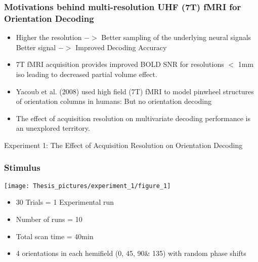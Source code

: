 \documentclass{beamer}
\begin{document}
	\begin{frame}
		\frametitle{Motivations behind multi-resolution UHF (7T) fMRI for Orientation Decoding}
		\begin{itemize}
		
			\item Higher the resolution $->$ Better sampling of the underlying neural signals \\
					Better signal $->$ Improved Decoding Accuracy
					
			\item  7T fMRI acquisition provides improved BOLD SNR for 
			resolutions $<$ 1mm iso leading to decreased partial volume effect.
			
			\item Yacoub et al. (2008) used high field (7T) fMRI to model pinwheel structures of 
			orientation columns in humans: But no orientation decoding
			
			\item The effect of acquisition resolution on multivariate decoding 
			performance is an unexplored territory.
			

		\end{itemize}
	\end{frame}	


	\begin{frame}
		\begin{center}
			\Large Experiment 1: The Effect of Acquisition Resolution on Orientation Decoding
		\end{center}
	\end{frame}

    \begin{frame}
        \frametitle{Stimulus}
            \begin{center}
                \texttt{[image: Thesis\_pictures/experiment\_1/figure\_1]}
            \end{center}
            \begin{itemize}
                \item 30 Trials = 1 Experimental run
                \item Number of runs = 10
                \item Total scan time = 40min
                \item 4 orientations in each hemifield (0\textdegree, 45\textdegree, 90\textdegree \& 135\textdegree) with random phase shifts
            \end{itemize}
    \end{frame}
\end{document}
